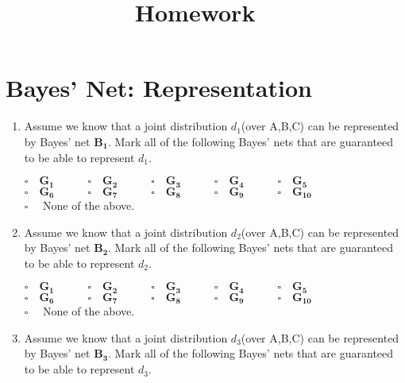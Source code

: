 \documentclass[11pt, answers]{exam}
\title{Homework \hmwkNumber\ \hmwkType}
\date{\hmwkDue}
\begin{document}
\maketitle

\section{Bayes' Net: Representation}



\begin{enumerate}
\item Assume we know that a joint distribution $d_1$(over A,B,C) can be represented by Bayes' net $\mathbf{B_1}$. Mark all of the following Bayes' nets that are guaranteed to be able to represent $d_1$.

$\square \quad \mathbf{G_1} \quad   \quad \quad \square \quad \mathbf{G_2} \quad \quad \quad \square  \quad\mathbf{G_3} \quad \quad \quad \square \quad \mathbf{G_4} \quad \quad \quad \square  \quad \mathbf{G_5}$\\

$\square \quad \mathbf{G_6} \quad   \quad \quad \square \quad \mathbf{G_7} \quad \quad \quad \square  \quad\mathbf{G_8} \quad \quad \quad \square \quad \mathbf{G_9} \quad \quad \quad \square  \quad \mathbf{G_{10}}$\\

$\square \quad $ None of the above.



\item Assume we know that a joint distribution $d_2$(over A,B,C) can be represented by Bayes' net $\mathbf{B_2}$. Mark all of the following Bayes' nets that are guaranteed to be able to represent $d_2$.

$\square \quad \mathbf{G_1} \quad   \quad \quad \square \quad \mathbf{G_2} \quad \quad \quad \square  \quad\mathbf{G_3} \quad \quad \quad \square \quad \mathbf{G_4} \quad \quad \quad \square  \quad \mathbf{G_5}$\\

$\square \quad \mathbf{G_6} \quad   \quad \quad \square \quad \mathbf{G_7} \quad \quad \quad \square  \quad\mathbf{G_8} \quad \quad \quad \square \quad \mathbf{G_9} \quad \quad \quad \square  \quad \mathbf{G_{10}}$\\

$\square \quad $ None of the above.

\item Assume we know that a joint distribution $d_3$(over A,B,C) can be represented by Bayes' net $\mathbf{B_3}$. Mark all of the following Bayes' nets that are guaranteed to be able to represent $d_3$.


\end{enumerate}
\end{document}
